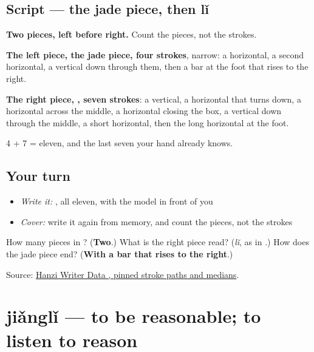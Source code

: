 \subsection*{Script — the jade piece, then lǐ}

\begin{quote}
\end{quote}

\textbf{Two pieces, left before right.} Count the pieces, not the strokes.

\textbf{The left piece, the jade piece, four strokes}, narrow: a horizontal, a second horizontal, a vertical down through them, then a bar at the foot that rises to the right.

\textbf{The right piece, , seven strokes}: a vertical, a horizontal that turns down, a horizontal across the middle, a horizontal closing the box, a vertical down through the middle, a short horizontal, then the long horizontal at the foot.

4 + 7 = eleven, and the last seven your hand already knows.

\subsection*{Your turn}
\begin{itemize}
\raggedright
  \item \emph{Write it:} , all eleven, with the model in front of you
  \item \emph{Cover:} write it again from memory, and count the pieces, not the strokes
\end{itemize}

\begin{tcolorbox}[breakable,colback=teal!4,colframe=teal!35!black,title={Before you move on}]
How many pieces in ? (\textbf{Two}.) What is the right piece read? (\emph{lǐ}, as in .) How does the jade piece end? (\textbf{With a bar that rises to the right}.)

Source: \href{https://raw.githubusercontent.com/chanind/hanzi-writer-data/68d10a4b21150cae5e1ebbd223eed289cf32d90c/data/\%E7\%90\%86.json}{Hanzi Writer Data , pinned stroke paths and medians}.
\end{tcolorbox}
\section[jiǎnglǐ]{jiǎnglǐ — to be reasonable; to listen to reason}

